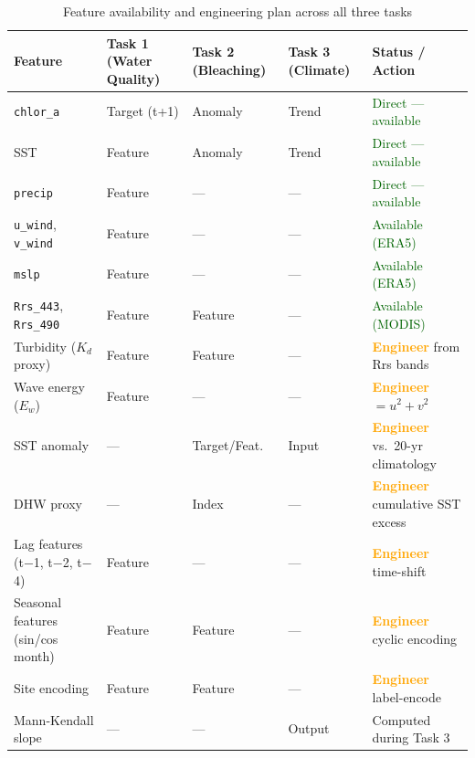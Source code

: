\documentclass[12pt,a4paper]{report}
\begin{document}
\begin{table}[H]
\centering
\caption{Feature availability and engineering plan across all three tasks}
\begin{tabular}{L{3.2cm}C{1.4cm}C{1.4cm}C{1.4cm}L{4.5cm}}
\toprule
\textbf{Feature} & \textbf{Task 1 (Water Quality)} & \textbf{Task 2 (Bleaching)} & \textbf{Task 3 (Climate)} & \textbf{Status / Action} \\
\midrule
{}
\texttt{chlor\_a} & Target (t+1) & Anomaly & Trend & \textcolor{darkgreen}{Direct — available} \\
SST & Feature & Anomaly & Trend & \textcolor{darkgreen}{Direct — available} \\
\texttt{precip} & Feature & --- & --- & \textcolor{darkgreen}{Direct — available} \\
\texttt{u\_wind}, \texttt{v\_wind} & Feature & --- & --- & \textcolor{darkgreen}{Available (ERA5)} \\
\texttt{mslp} & Feature & --- & --- & \textcolor{darkgreen}{Available (ERA5)} \\
\texttt{Rrs\_443}, \texttt{Rrs\_490} & Feature & Feature & --- & \textcolor{darkgreen}{Available (MODIS)} \\
Turbidity ($K_d$ proxy) & Feature & Feature & --- & \textcolor{orange}{\textbf{Engineer}} from Rrs bands \\
Wave energy ($E_w$) & Feature & --- & --- & \textcolor{orange}{\textbf{Engineer}} $= u^2 + v^2$ \\
SST anomaly & --- & Target/Feat. & Input & \textcolor{orange}{\textbf{Engineer}} vs.\ 20-yr climatology \\
DHW proxy & --- & Index & --- & \textcolor{orange}{\textbf{Engineer}} cumulative SST excess \\
Lag features (t$-$1, t$-$2, t$-$4) & Feature & --- & --- & \textcolor{orange}{\textbf{Engineer}} time-shift \\
Seasonal features (sin/cos month) & Feature & Feature & --- & \textcolor{orange}{\textbf{Engineer}} cyclic encoding \\
Site encoding & Feature & Feature & --- & \textcolor{orange}{\textbf{Engineer}} label-encode \\
Mann-Kendall slope & --- & --- & Output & Computed during Task 3 \\
\bottomrule
\end{tabular}
\label{tab:features}
\end{table}
\end{document}
